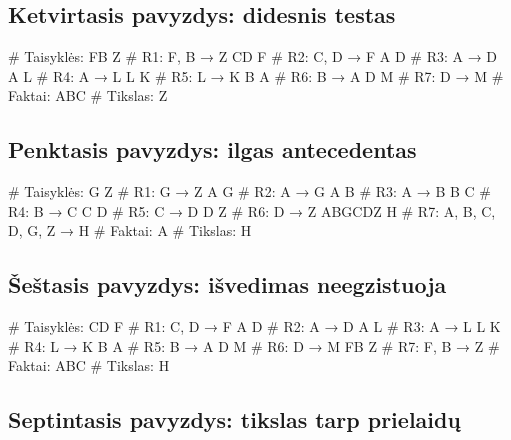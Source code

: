 \subsection{Ketvirtasis pavyzdys: didesnis testas}

\begin{pythonaienv}[fc]
# Taisyklės:
FB Z                                    # R1: F, B → Z
CD F                                    # R2: C, D → F
A D                                     # R3: A → D
A L                                     # R4: A → L
L K                                     # R5: L → K
B A                                     # R6: B → A
D M                                     # R7: D → M
# Faktai:
ABC
# Tikslas:
Z
\end{pythonaienv}

\subsection{Penktasis pavyzdys: ilgas antecedentas}

\begin{pythonaienv}[fc]
# Taisyklės:
G Z                                     # R1: G → Z
A G                                     # R2: A → G
A B                                     # R3: A → B
B C                                     # R4: B → C
C D                                     # R5: C → D
D Z                                     # R6: D → Z
ABGCDZ H                                # R7: A, B, C, D, G, Z → H
# Faktai:
A
# Tikslas:
H
\end{pythonaienv}

\subsection{Šeštasis pavyzdys: išvedimas neegzistuoja}

\begin{pythonaienv}[fc]
# Taisyklės:
CD F                                    # R1: C, D → F
A D                                     # R2: A → D
A L                                     # R3: A → L
L K                                     # R4: L → K
B A                                     # R5: B → A
D M                                     # R6: D → M
FB Z                                    # R7: F, B → Z
# Faktai:
ABC
# Tikslas:
H
\end{pythonaienv}

\subsection{Septintasis pavyzdys: tikslas tarp prielaidų}

